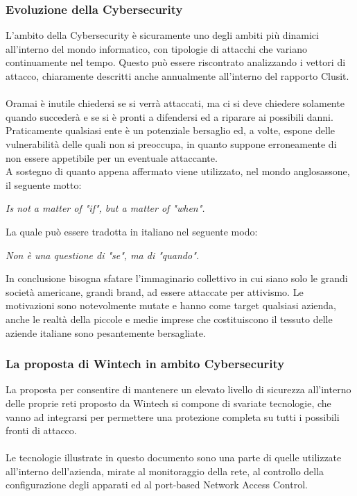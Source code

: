 \documentclass[Tesi.tex]{subfiles}
\begin{document}
\subsubsection{Evoluzione della Cybersecurity}
L'ambito della Cybersecurity è sicuramente uno degli ambiti più dinamici all'interno del mondo informatico, con tipologie di attacchi che variano continuamente nel tempo. Questo può essere riscontrato analizzando i vettori di attacco, chiaramente descritti anche annualmente all'interno del rapporto Clusit. \\\\
Oramai è inutile chiedersi se si verrà attaccati, ma ci si deve chiedere solamente quando succederà e se si è pronti a difendersi ed a riparare ai possibili danni. 
Praticamente qualsiasi ente è un potenziale bersaglio ed, a volte, espone delle vulnerabilità delle quali non si preoccupa, in quanto suppone erroneamente di non essere appetibile per un eventuale attaccante. \\
A sostegno di quanto appena affermato viene utilizzato, nel mondo anglosassone, il seguente motto:
\begin{center} \textsl{Is not a matter of "if", but a matter of "when".} \end{center}
La quale può essere tradotta in italiano nel seguente modo:
\begin{center} \textsl{Non è una questione di "se", ma di "quando".} \end{center}
In conclusione bisogna sfatare l'immaginario collettivo in cui siano solo le grandi società americane, grandi brand, ad essere attaccate per attivismo. Le motivazioni sono notevolmente mutate e hanno come target qualsiasi azienda, anche le realtà della piccole e medie imprese che costituiscono il tessuto delle aziende italiane sono pesantemente bersagliate.

\subsubsection{La proposta di Wintech in ambito Cybersecurity}
La proposta per consentire di mantenere un elevato livello di sicurezza all'interno delle proprie reti proposto da Wintech si compone di svariate tecnologie, che vanno ad integrarsi per permettere una protezione completa su tutti i possibili fronti di attacco. \\\\
Le tecnologie illustrate in questo documento sono una parte di quelle utilizzate all'interno dell'azienda, mirate al monitoraggio della rete, al controllo della configurazione degli apparati ed al port-based Network Access Control.
\end{document}
